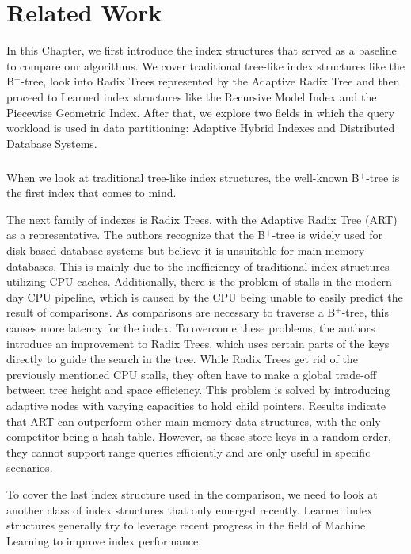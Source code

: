 \thispagestyle{plain}
\chapter{Related Work}\label{sec:related_work}

In this Chapter, we first introduce the index structures that served as a baseline to compare our algorithms. We cover traditional tree-like index structures like the B$^+$-tree, look into Radix Trees represented by the Adaptive Radix Tree and then proceed to Learned index structures like the Recursive Model Index and the Piecewise Geometric Index. After that, we explore two fields in which the query workload is used in data partitioning: Adaptive Hybrid Indexes and Distributed Database Systems.

\paragraph{} 
When we look at traditional tree-like index structures, the well-known B$^+$-tree \cite{Bayer1970-rh} is the first index that comes to mind.

The next family of indexes is Radix Trees, with the Adaptive Radix Tree (ART) \cite{Leis2013} as a representative. The authors recognize that the B$^+$-tree is widely used for disk-based database systems but believe it is unsuitable for main-memory databases. This is mainly due to the inefficiency of traditional index structures utilizing CPU caches. Additionally, there is the problem of stalls in the modern-day CPU pipeline, which is caused by the CPU being unable to easily predict the result of comparisons. As comparisons are necessary to  traverse a B$^+$-tree, this causes more latency for the index. To overcome these problems, the authors introduce an improvement to Radix Trees, which uses certain parts of the keys directly to guide the search in the tree. While Radix Trees get rid of the previously mentioned CPU stalls, they often have to make a global trade-off between tree height and space efficiency. This problem is solved by introducing adaptive nodes with varying capacities to hold child pointers. Results indicate that ART can outperform other main-memory data structures, with the only competitor being a hash table. However, as these store keys in a random order, they cannot support range queries efficiently and are only useful in specific scenarios.

To cover the last index structure used in the comparison, we need to look at another class of index structures that only emerged recently. Learned index structures generally try to leverage recent progress in the field of Machine Learning to improve index performance.

